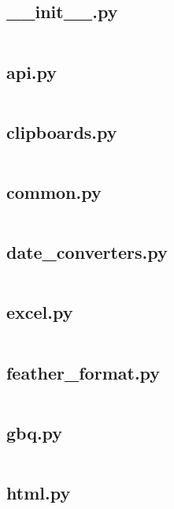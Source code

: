 \documentclass{article}
\begin{document}
\subsection{\_\_init\_\_.py}
\inputminted{python}{/home/dufferzafar/dev/@clones/pandas/pandas/io/__init__.py}
\newpage

\subsection{api.py}
\inputminted{python}{/home/dufferzafar/dev/@clones/pandas/pandas/io/api.py}
\newpage

\subsection{clipboards.py}
\inputminted{python}{/home/dufferzafar/dev/@clones/pandas/pandas/io/clipboards.py}
\newpage

\subsection{common.py}
\inputminted{python}{/home/dufferzafar/dev/@clones/pandas/pandas/io/common.py}
\newpage

\subsection{date\_converters.py}
\inputminted{python}{/home/dufferzafar/dev/@clones/pandas/pandas/io/date_converters.py}
\newpage

\subsection{excel.py}
\inputminted{python}{/home/dufferzafar/dev/@clones/pandas/pandas/io/excel.py}
\newpage

\subsection{feather\_format.py}
\inputminted{python}{/home/dufferzafar/dev/@clones/pandas/pandas/io/feather_format.py}
\newpage

\subsection{gbq.py}
\inputminted{python}{/home/dufferzafar/dev/@clones/pandas/pandas/io/gbq.py}
\newpage

\subsection{html.py}
\inputminted{python}{/home/dufferzafar/dev/@clones/pandas/pandas/io/html.py}
\newpage
\end{document}
